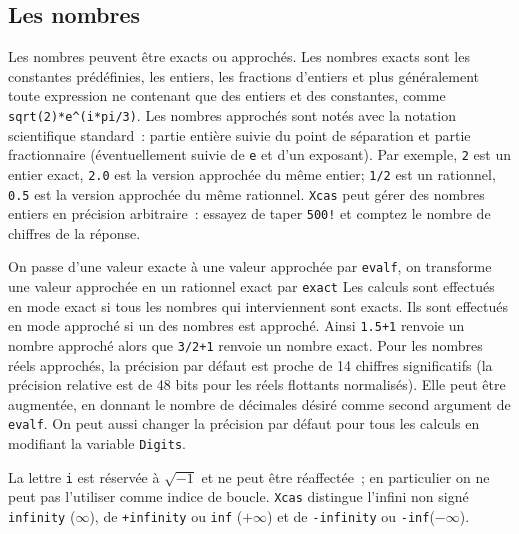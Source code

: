 \documentclass{article}
\begin{document}
\begin{giacjshere}
\subsection{Les nombres}
%
Les nombres peuvent \^etre exacts ou approch\'es.
Les nombres exacts sont les constantes pr\'ed\'efinies, les entiers, 
les fractions d'entiers et plus g\'en\'eralement toute  expression 
ne contenant que des entiers et des constantes, comme 
\verb|sqrt(2)*e^(i*pi/3)|.
Les nombres approch\'es sont not\'es avec la notation scientifique 
standard~: partie enti\`ere suivie du point de s\'eparation 
et partie fractionnaire (\'eventuellement
suivie de \verb|e| et d'un exposant).
Par exemple, \verb|2| est un entier exact, 
\verb|2.0| est la version approch\'ee du m\^eme
entier; \verb|1/2| est un  rationnel, \verb|0.5| 
est la version approch\'ee du m\^eme
rationnel.
{\tt Xcas} peut g\'erer des nombres entiers en pr\'ecision arbitraire~: 
essayez de taper \verb|500!| et comptez le nombre de chiffres 
de la r\'eponse.

On passe d'une valeur exacte \`a une valeur approch\'ee par
\verb|evalf|, on transforme une valeur approch\'ee en un rationnel
exact par \verb|exact|
Les calculs sont effectu\'es en mode exact si tous les nombres qui
interviennent sont exacts. Ils sont effectu\'es en mode approch\'e si
un des nombres est approch\'e. Ainsi
\verb|1.5+1| renvoie un nombre approch\'e alors que \verb|3/2+1| 
renvoie un nombre exact.
Pour les nombres r\'eels approch\'es, la pr\'ecision par d\'efaut est
proche de 14 chiffres significatifs (la pr\'ecision relative est de 48
bits pour les r\'eels flottants normalis\'es). 
Elle peut \^etre augment\'ee, en
donnant le nombre de d\'ecimales d\'esir\'e
comme second argument de \verb|evalf|.
On peut aussi changer la pr\'ecision par d\'efaut pour tous les
calculs en modifiant
la variable \verb|Digits|.

La lettre \verb|i| est r\'eserv\'ee \`a $\sqrt{-1}$ et ne peut \^etre
r\'eaffect\'ee~; en particulier on ne peut pas l'utiliser comme indice
de boucle.
{\tt Xcas} distingue l'infini non sign\'e \verb|infinity| ($\infty$), de
\verb|+infinity| ou \verb|inf| ($+\infty$) et de \verb|-infinity|  
ou \verb|-inf|($-\infty$).


\end{giacjshere}
\end{document}
